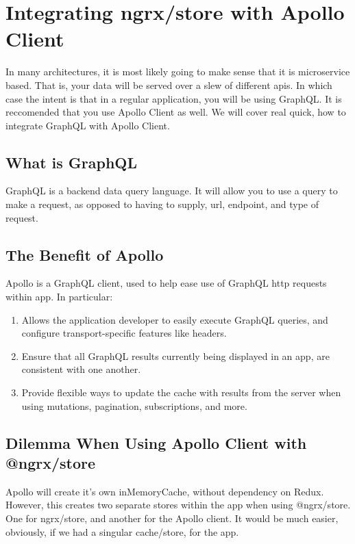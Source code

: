 \maketitle{}
\section{ Integrating ngrx/store with Apollo Client }
In many architectures, it is most likely going to make sense that it is
microservice based. That is, your data will be served over a slew of different
apis. In which case the intent is that in a regular application, you will be
using GraphQL. It is reccomended that you use Apollo Client as well. We will
cover real quick, how to integrate GraphQL with Apollo Client.

\subsection{ What is GraphQL }
GraphQL is a backend data query language. It will allow you to use a query to
make a request, as opposed to having to supply, url, endpoint, and type of
request.

\subsection{ The Benefit of Apollo }
Apollo is a GraphQL client, used to help ease use of GraphQL http requests
within app. In particular:
\begin{enumerate}
  \item Allows the application developer to easily execute GraphQL queries, and
  configure transport-specific features like headers.
  \item Ensure that all GraphQL results currently being displayed in an app, are
   consistent with one another.
  \item Provide flexible ways to update the cache with results from the server
  when using mutations, pagination, subscriptions, and more.
\end{enumerate}

\subsection{ Dilemma When Using Apollo Client with @ngrx/store }
Apollo will create it’s own inMemoryCache, without dependency on Redux. However,
this creates two separate stores within the app when using @ngrx/store.
One for ngrx/store, and another for the Apollo client. It would be much easier,
obviously, if we had a singular cache/store, for the app.


